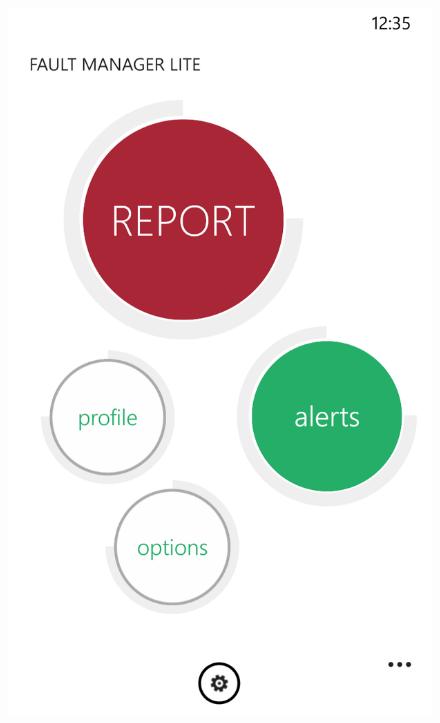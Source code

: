 \documentclass{report}
\begin{document}
\begin{figure}[hbtp]
\centering
\begin{minipage}{0.3\textwidth}
\includegraphics[width=\textwidth]{img/MainPage.png}
\end{minipage}
\hspace{0.1\textwidth}
\begin{minipage}{0.3\textwidth}

\end{minipage}
\end{figure}
\end{document}
